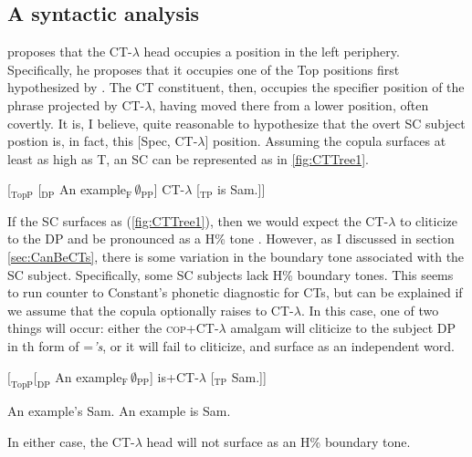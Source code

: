 \documentclass[
]{RCL}
\begin{document}
\subsection{A syntactic analysis}\label{sec:syntax}
\citet[124]{constant2014diss} proposes that the CT-$\lambda$ head occupies a position in the left periphery.
Specifically, he proposes that it occupies one of the Top positions first hypothesized by \citet{rizzi1997fine}.
The CT constituent, then, occupies the specifier position of the phrase projected by CT-$\lambda$, having moved there from a lower position, often covertly.
It is, I believe, quite reasonable to hypothesize that the overt SC subject postion is, in fact, this [Spec, CT-$\lambda$] position.
Assuming the copula surfaces at least as high as T, an SC can be represented as in \ref{fig:CTTree1}.
\begin{exe}
\ex\label{fig:CTTree1} [$_\text{TopP}$ [$_\text{DP}$ An example$_\text{F}\,\emptyset_\text{PP}$] CT-$\lambda$ [$_\text{TP}$ is Sam.]]	
\end{exe}
If the SC surfaces as (\ref{fig:CTTree1}), then we would expect the CT-$\lambda$ to cliticize to the DP and be pronounced as a H\% tone \citep[following][]{constant2014diss}.
However, as I discussed in section \ref{sec:CanBeCTs}, there is some variation in the boundary tone associated with the SC subject.
Specifically, some SC subjects lack H\% boundary tones.
This seems to run counter to Constant's phonetic diagnostic for CTs, but can be explained if we assume that the copula optionally raises to CT-$\lambda$.
In this case, one of two things will occur: either the \textsc{cop}+CT-$\lambda$ amalgam will cliticize to the subject DP in th form of =\textit{'s}, or it will fail to cliticize, and surface as an independent word.
\begin{exe}
\ex $[_\text{TopP} [_\text{DP}$ An example$_\text{F}\,\emptyset_\text{PP}$] is+CT-$\lambda$ [$_\text{TP}$ Sam.]]
	\begin{xlist}
		\ex An example's Sam.
		\ex An example is Sam.
	\end{xlist}	
\end{exe}
In either case, the CT-$\lambda$ head will not surface as an H\% boundary tone.
\end{document}
